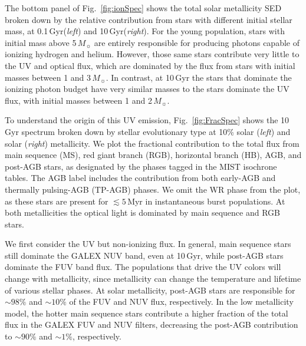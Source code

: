 \documentclass[preprint2]{aastex62}
\newcommand\Msun{\ensuremath{\,M_{\sun}}\xspace}
\newcommand{\Myr}{$\,$Myr\xspace}
\newcommand{\Gyr}{$\,$Gyr\xspace}
\begin{document}
The bottom panel of Fig.~\ref{fig:ionSpec} shows the total solar metallicity SED broken down by the relative contribution from stars with different initial stellar mass, at 0.1\Gyr (\emph{left}) and 10\Gyr (\emph{right}). For the young population, stars with initial mass above 5\Msun are entirely responsible for producing photons capable of ionizing hydrogen and helium. However, those same stars contribute very little to the UV and optical flux, which are dominated by the flux from stars with initial masses between 1 and 3\Msun. In contrast, at 10\Gyr the stars that dominate the ionizing photon budget have very similar masses to the stars dominate the UV flux, with initial masses between 1 and 2\Msun.

To understand the origin of this UV emission, Fig.~\ref{fig:FracSpec} shows the 10\Gyr spectrum broken down by stellar evolutionary type at 10\% solar (\emph{left}) and solar (\emph{right}) metallicity. We plot the fractional contribution to the total flux from main sequence (MS), red giant branch (RGB), horizontal branch (HB), AGB, and post-AGB stars, as designated by the phases tagged in the MIST isochrone tables. The AGB label includes the contribution from both early-AGB and thermally pulsing-AGB (TP-AGB) phases. We omit the WR phase from the plot, as these stars are present for $\lesssim5$\Myr in instantaneous burst populations. At both metallicities the optical light is dominated by main sequence and RGB stars. 

We first consider the UV but non-ionizing flux. In general, main sequence stars still dominate the GALEX NUV band, even at 10\Gyr, while post-AGB stars dominate the FUV band flux. The populations that drive the UV colors will change with metallicity, since metallicity can change the temperature and lifetime of various stellar phases. At solar metallicity, post-AGB stars are responsible for $\sim98\%$ and $\sim10\%$ of the FUV and NUV flux, respectively. In the low metallicity model, the hotter main sequence stars contribute a higher fraction of the total flux in the GALEX FUV and NUV filters, decreasing the post-AGB contribution to $\sim90\%$ and $\sim1\%$, respectively. %
\end{document}
